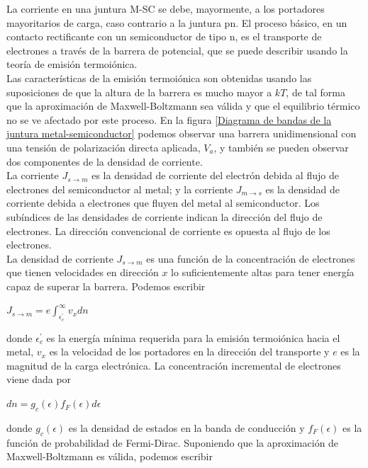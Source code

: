 \documentclass[oneside]{book}
\numberwithin{equation}{section}
\numberwithin{figure}{section}
\numberwithin{table}{section}
\begin{document}
			La corriente en una juntura M-SC se debe, mayormente, a los portadores mayoritarios de carga, caso contrario a la juntura pn. El proceso básico, en un contacto rectificante con un semiconductor de tipo n, es el transporte de electrones a través de la barrera de potencial, que se puede describir usando la teoría de emisión termoiónica.\\

			Las características de la emisión termoiónica son obtenidas usando las suposiciones de que la altura de la barrera es mucho mayor a $kT$, de tal forma que la aproximación de Maxwell-Boltzmann sea válida y que el equilibrio térmico no se ve afectado por este proceso. En la figura \ref{Diagrama de bandas de la juntura metal-semiconductor} podemos observar una barrera unidimensional con una tensión de polarización directa aplicada, $V_{a}$, y también se pueden observar dos componentes de la densidad de corriente.\\

			La corriente $J_{s \rightarrow m}$ es la densidad de corriente del electrón debida al flujo de electrones del semiconductor al metal; y la corriente $J_{m \rightarrow s}$ es la densidad de corriente debida a electrones que fluyen del metal al semiconductor. Los subíndices de las densidades de corriente indican la dirección del flujo de electrones. La dirección convencional de corriente es opuesta al flujo de los electrones.\\

			La densidad de corriente $J_{s \rightarrow m}$ es una función de la concentración de electrones que tienen velocidades en dirección $x$ lo suficientemente altas para tener energía capaz de superar la barrera. Podemos escribir

			\begin{center}
				$J_{s \rightarrow m}=e \int_{\epsilon^\prime_c}^{\infty} v_x dn$
			\end{center}

			donde $\epsilon^\prime_c$ es la energía mínima requerida para la emisión termoiónica hacia el metal, $v_x$ es la velocidad de los portadores en la dirección del transporte y $e$ es la magnitud de la carga electrónica. La concentración incremental de electrones viene dada por
			
			\begin{center}
				$dn = g_c(\epsilon)f_F(\epsilon) d\epsilon$
			\end{center}
			
			donde $g_c(\epsilon)$ es la densidad de estados en la banda de conducción y $f_F(\epsilon)$ es la función de probabilidad de Fermi-Dirac. Suponiendo que la aproximación de Maxwell-Boltzmann es válida, podemos escribir
			
\end{document}
